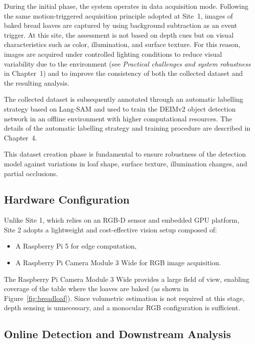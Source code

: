 During the initial phase, the system operates in data acquisition mode. Following the same motion-triggered acquisition principle adopted at Site~1, images of baked bread loaves are captured by using background subtraction as an event trigger. At this site, the assessment is not based on depth cues but on visual characteristics such as color, illumination, and surface texture. For this reason, images are acquired under controlled lighting conditions to reduce visual variability due to the environment (see \emph{Practical challenges and system robustness} in Chapter~1) and to improve the consistency of both the collected dataset and the resulting analysis.

The collected dataset is subsequently annotated through an automatic labelling strategy based on Lang-SAM \cite{medeiros_luca-medeiroslang-segment-anything_2026} and used to train the DEIMv2 \cite{huang_real-time_2026} object detection network in an offline environment with higher computational resources. The details of the automatic labelling strategy and training procedure are described in Chapter~4.

This dataset creation phase is fundamental to ensure robustness of the detection model against variations in loaf shape, surface texture, illumination changes, and partial occlusions.

\subsection{Hardware Configuration}

Unlike Site 1, which relies on an RGB-D sensor and embedded GPU platform, Site 2 adopts a lightweight and cost-effective vision setup composed of:

\begin{itemize}
    \item A Raspberry Pi 5 \cite{raspberrypi_raspberry_pi_5_2026} for edge computation,
    \item A Raspberry Pi Camera Module 3 Wide \cite{raspberrypi_camera_documentation_2026} for RGB image acquisition.
\end{itemize}

The Raspberry Pi Camera Module 3 Wide provides a large field of view, enabling coverage of the table where the loaves are baked (as shown in Figure~\ref{fig:breadloaf}). Since volumetric estimation is not required at this stage, depth sensing is unnecessary, and a monocular RGB configuration is sufficient.

\subsection{Online Detection and Downstream Analysis}


